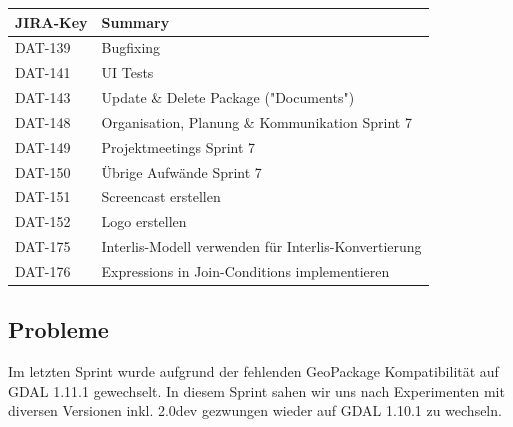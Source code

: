 \begin{table}[H]	
\centering
\begin{tabular}{ll}
\toprule
\textbf{JIRA-Key} & \textbf{Summary}\\
\midrule
DAT-139 & Bugfixing \\
DAT-141 & UI Tests \\
DAT-143 & Update \& Delete Package ("Documents") \\
DAT-148 & Organisation, Planung \& Kommunikation Sprint 7 \\
DAT-149 & Projektmeetings Sprint 7 \\
DAT-150 & Übrige Aufwände Sprint 7 \\
DAT-151 & Screencast erstellen \\
DAT-152 & Logo erstellen \\
DAT-175 & Interlis-Modell verwenden für Interlis-Konvertierung \\
DAT-176 & Expressions in Join-Conditions implementieren \\
\bottomrule
\end{tabular}	
\end{table}

\subsection{Probleme}
Im letzten Sprint wurde aufgrund der fehlenden GeoPackage Kompatibilität auf GDAL 1.11.1 gewechselt. In diesem Sprint sahen wir uns nach Experimenten mit diversen Versionen inkl. 2.0dev gezwungen wieder auf GDAL 1.10.1 zu wechseln.